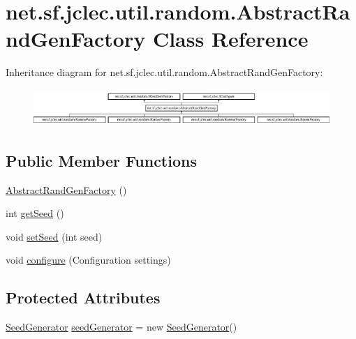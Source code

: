 \hypertarget{classnet_1_1sf_1_1jclec_1_1util_1_1random_1_1_abstract_rand_gen_factory}{\section{net.\-sf.\-jclec.\-util.\-random.\-Abstract\-Rand\-Gen\-Factory Class Reference}
\label{classnet_1_1sf_1_1jclec_1_1util_1_1random_1_1_abstract_rand_gen_factory}
}
Inheritance diagram for net.\-sf.\-jclec.\-util.\-random.\-Abstract\-Rand\-Gen\-Factory\-:\begin{figure}[H]
\begin{center}
\leavevmode
\includegraphics[height=1.423729cm]{classnet_1_1sf_1_1jclec_1_1util_1_1random_1_1_abstract_rand_gen_factory}
\end{center}
\end{figure}
\subsection*{Public Member Functions}
\begin{DoxyCompactItemize}
\item 
\hyperlink{classnet_1_1sf_1_1jclec_1_1util_1_1random_1_1_abstract_rand_gen_factory_a951485e5b8b752b7bf3c11558238e25b}{Abstract\-Rand\-Gen\-Factory} ()
\item 
int \hyperlink{classnet_1_1sf_1_1jclec_1_1util_1_1random_1_1_abstract_rand_gen_factory_a7079e322cbf8af86411018419fa4258f}{get\-Seed} ()
\item 
void \hyperlink{classnet_1_1sf_1_1jclec_1_1util_1_1random_1_1_abstract_rand_gen_factory_ac87c545525657b0dee889c52c42ce58d}{set\-Seed} (int seed)
\item 
void \hyperlink{classnet_1_1sf_1_1jclec_1_1util_1_1random_1_1_abstract_rand_gen_factory_adbcc614c5ec7ae7d3a161286f2e5f741}{configure} (Configuration settings)
\end{DoxyCompactItemize}
\subsection*{Protected Attributes}
\begin{DoxyCompactItemize}
\item 
\hyperlink{classnet_1_1sf_1_1jclec_1_1util_1_1random_1_1_seed_generator}{Seed\-Generator} \hyperlink{classnet_1_1sf_1_1jclec_1_1util_1_1random_1_1_abstract_rand_gen_factory_ae3ca4d4c2dd0f8b276b2ef5d9725dae8}{seed\-Generator} = new \hyperlink{classnet_1_1sf_1_1jclec_1_1util_1_1random_1_1_seed_generator}{Seed\-Generator}()
\end{DoxyCompactItemize}


